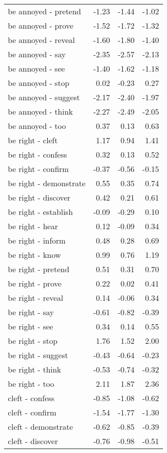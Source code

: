 \begin{longtable}{lrrr}
  be annoyed - pretend & -1.23 & -1.44 & -1.02 \\ 
  be annoyed - prove & -1.52 & -1.72 & -1.32 \\ 
  be annoyed - reveal & -1.60 & -1.80 & -1.40 \\ 
  be annoyed - say & -2.35 & -2.57 & -2.13 \\ 
  be annoyed - see & -1.40 & -1.62 & -1.18 \\ 
  be annoyed - stop & 0.02 & -0.23 & 0.27 \\ 
  be annoyed - suggest & -2.17 & -2.40 & -1.97 \\ 
  be annoyed - think & -2.27 & -2.49 & -2.05 \\ 
  be annoyed - too & 0.37 & 0.13 & 0.63 \\ 
  be right - cleft & 1.17 & 0.94 & 1.41 \\ 
  be right - confess & 0.32 & 0.13 & 0.52 \\ 
  be right - confirm & -0.37 & -0.56 & -0.15 \\ 
  be right - demonstrate & 0.55 & 0.35 & 0.74 \\ 
  be right - discover & 0.42 & 0.21 & 0.61 \\ 
  be right - establish & -0.09 & -0.29 & 0.10 \\ 
  be right - hear & 0.12 & -0.09 & 0.34 \\ 
  be right - inform & 0.48 & 0.28 & 0.69 \\ 
  be right - know & 0.99 & 0.76 & 1.19 \\ 
  be right - pretend & 0.51 & 0.31 & 0.70 \\ 
  be right - prove & 0.22 & 0.02 & 0.41 \\ 
  be right - reveal & 0.14 & -0.06 & 0.34 \\ 
  be right - say & -0.61 & -0.82 & -0.39 \\ 
  be right - see & 0.34 & 0.14 & 0.55 \\ 
  be right - stop & 1.76 & 1.52 & 2.00 \\ 
  be right - suggest & -0.43 & -0.64 & -0.23 \\ 
  be right - think & -0.53 & -0.74 & -0.32 \\ 
  be right - too & 2.11 & 1.87 & 2.36 \\ 
  cleft - confess & -0.85 & -1.08 & -0.62 \\ 
  cleft - confirm & -1.54 & -1.77 & -1.30 \\ 
  cleft - demonstrate & -0.62 & -0.85 & -0.39 \\ 
  cleft - discover & -0.76 & -0.98 & -0.51 \\ 

\end{longtable}
